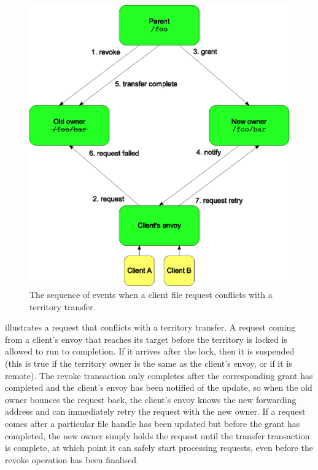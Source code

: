 \begin{figure}[t]
\centering
\includegraphics[width=\figwidth]{figures/migrate-sync}
\caption[Sequence of events in a territory migration]{The sequence of events when a client file request conflicts with a territory transfer.}
\label{fig:migrate-sync}
\end{figure}

 illustrates a request that conflicts with a territory transfer. A request coming from a client's envoy that reaches its target before the territory is locked is allowed to run to completion. If it arrives after the lock, then it is suspended (this is true if the territory owner is the same as the client's envoy, or if it is remote). The revoke transaction only completes after the corresponding grant has completed and the client's envoy has been notified of the update, so when the old owner bounces the request back, the client's envoy knows the new forwarding address and can immediately retry the request with the new owner. If a request comes after a particular file handle has been updated but before the grant has completed, the new owner simply holds the request until the transfer transaction is complete, at which point it can safely start processing requests, even before the revoke operation has been finalised.

